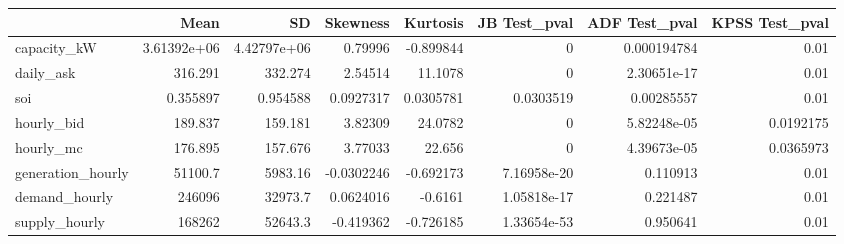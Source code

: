 \begin{tabular}{lrrrrrrr}
\hline
                   &             Mean &              SD &   Skewness &   Kurtosis &   JB Test\_pval &   ADF Test\_pval &   KPSS Test\_pval \\
\hline
 capacity\_kW       &      3.61392e+06 &     4.42797e+06 &  0.79996   & -0.899844  &    0           &     0.000194784 &        0.01      \\
 daily\_ask         &    316.291       &   332.274       &  2.54514   & 11.1078    &    0           &     2.30651e-17 &        0.01      \\
 soi               &      0.355897    &     0.954588    &  0.0927317 &  0.0305781 &    0.0303519   &     0.00285557  &        0.01      \\
 hourly\_bid        &    189.837       &   159.181       &  3.82309   & 24.0782    &    0           &     5.82248e-05 &        0.0192175 \\
 hourly\_mc         &    176.895       &   157.676       &  3.77033   & 22.656     &    0           &     4.39673e-05 &        0.0365973 \\
 generation\_hourly &  51100.7         &  5983.16        & -0.0302246 & -0.692173  &    7.16958e-20 &     0.110913    &        0.01      \\
 demand\_hourly     & 246096           & 32973.7         &  0.0624016 & -0.6161    &    1.05818e-17 &     0.221487    &        0.01      \\
 supply\_hourly     & 168262           & 52643.3         & -0.419362  & -0.726185  &    1.33654e-53 &     0.950641    &        0.01      \\
\hline
\end{tabular}